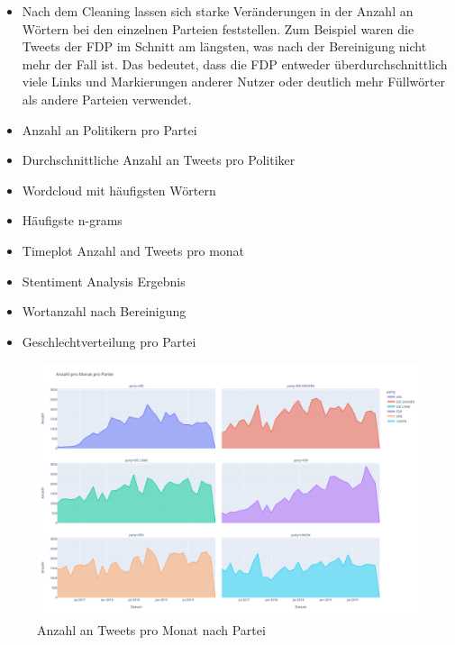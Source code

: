 \begin{itemize}
    \item Nach dem Cleaning lassen sich starke Veränderungen in der Anzahl an Wörtern bei den einzelnen Parteien feststellen. Zum Beispiel waren die Tweets der \ac{FDP} im Schnitt am längsten, was nach der Bereinigung nicht mehr der Fall ist. Das bedeutet, dass die \ac{FDP} entweder überdurchschnittlich viele Links und Markierungen anderer Nutzer oder deutlich mehr Füllwörter als andere Parteien verwendet.
    \item Anzahl an Politikern pro Partei
    \item Durchschnittliche Anzahl an Tweets pro Politiker
    \item Wordcloud mit häufigsten Wörtern
    \item Häufigste n-grams
    \item Timeplot Anzahl and Tweets pro monat
    \item Stentiment Analysis Ergebnis
    \item Wortanzahl nach Bereinigung
    \item Geschlechtverteilung pro Partei
\end{itemize}


\begin{figure}[H]
    \centering
    \includegraphics[width=\linewidth]{data/images/anzahl_pro_monat_pro_partei.png}
    \caption{Anzahl an Tweets pro Monat nach Partei} \label{fig:countTweetsTimeline}
\end{figure}


